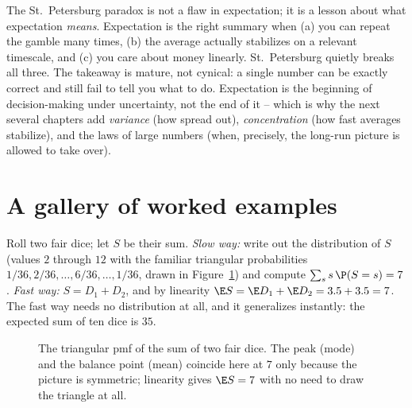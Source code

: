 \begin{aestheticbox}
The St.\ Petersburg paradox is not a flaw in expectation; it is a lesson about
what expectation \emph{means}. Expectation is the right summary when (a) you can
repeat the gamble many times, (b) the average actually stabilizes on a relevant
timescale, and (c) you care about money linearly. St.\ Petersburg quietly breaks
all three. The takeaway is mature, not cynical: a single number can be exactly
correct and still fail to tell you what to do. Expectation is the beginning of
decision-making under uncertainty, not the end of it -- which is why the next
several chapters add \emph{variance} (how spread out), \emph{concentration} (how
fast averages stabilize), and the laws of large numbers (when, precisely, the
long-run picture is allowed to take over).
\end{aestheticbox}

\section{A gallery of worked examples}
\label{ch08:gallery}

\begin{example}
\label{ch08:ex-two-dice}
Roll two fair dice; let $S$ be their sum. \emph{Slow way:} write out the
distribution of $S$ (values $2$ through $12$ with the familiar triangular
probabilities $1/36, 2/36, \dots, 6/36, \dots, 1/36$, drawn in
Figure~\ref{ch08:fig-two-dice}) and compute $\sum_s s\,\P(S=s) = 7$. \emph{Fast way:} $S = D_1 + D_2$, and by linearity
$\E S = \E D_1 + \E D_2 = 3.5 + 3.5 = 7$. The fast way needs no distribution at
all, and it generalizes instantly: the expected sum of ten dice is $35$.
\end{example}

\begin{figure}[H]
\centering
{}
\caption{The triangular pmf of the sum of two fair dice. The peak (mode) and the
balance point (mean) coincide here at $7$ only because the picture is symmetric;
linearity gives $\E S = 7$ with no need to draw the triangle at all.}
\label{ch08:fig-two-dice}
\end{figure}

